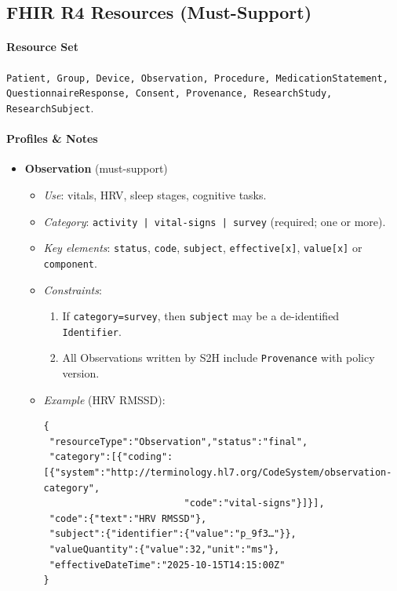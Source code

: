 \documentclass[11pt]{article}
\theoremstyle{plain}
\begin{document}
\subsection{FHIR R4 Resources (Must-Support)}\label{sec:fhir-must-support}

\paragraph{Resource Set}
\texttt{Patient, Group, Device, Observation, Procedure, MedicationStatement, QuestionnaireResponse, Consent, Provenance, ResearchStudy, ResearchSubject}.

\paragraph{Profiles \& Notes}
\begin{itemize}
  \item \textbf{Observation} (must-support)
    \begin{itemize}
      \item \emph{Use}: vitals, HRV, sleep stages, cognitive tasks.
      \item \emph{Category}: \texttt{activity | vital-signs | survey} (required; one or more).
      \item \emph{Key elements}: \texttt{status}, \texttt{code}, \texttt{subject}, \texttt{effective[x]}, \texttt{value[x]} or \texttt{component}.
      \item \emph{Constraints}:
        \begin{enumerate}
          \item If \texttt{category=survey}, then \texttt{subject} may be a de-identified \texttt{Identifier}.
          \item All Observations written by S2H include \texttt{Provenance} with policy version.
        \end{enumerate}
      \item \emph{Example} (HRV RMSSD):
\begin{verbatim}
{
 "resourceType":"Observation","status":"final",
 "category":[{"coding":[{"system":"http://terminology.hl7.org/CodeSystem/observation-category",
                         "code":"vital-signs"}]}],
 "code":{"text":"HRV RMSSD"},
 "subject":{"identifier":{"value":"p_9f3…"}},
 "valueQuantity":{"value":32,"unit":"ms"},
 "effectiveDateTime":"2025-10-15T14:15:00Z"
}
\end{verbatim}
    \end{itemize}


\end{itemize}
\end{document}
